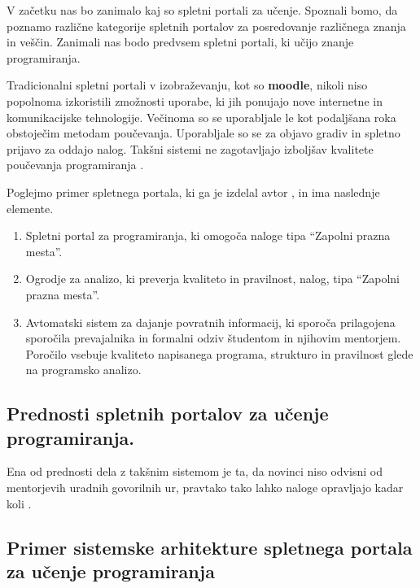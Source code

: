 V začetku nas bo zanimalo kaj so spletni portali za učenje. Spoznali
bomo, da poznamo različne kategorije spletnih portalov za posredovanje
različnega znanja in veščin. Zanimali nas bodo  predvsem spletni
portali, ki učijo znanje programiranja.

Tradicionalni spletni portali v izobraževanju, kot so \textbf{moodle},
nikoli niso popolnoma izkoristili zmožnosti uporabe, ki jih ponujajo
nove internetne in komunikacijske tehnologije. Večinoma so se
uporabljale le kot podaljšana roka obstoječim metodam
poučevanja. Uporabljale so se za objavo gradiv in spletno prijavo za
oddajo nalog. Takšni sistemi ne zagotavljajo izboljšav kvalitete
poučevanja programiranja \cite{ITaLCP_DistanceEdu}.

Poglejmo primer spletnega portala, ki ga je izdelal avtor
\cite{thesisAWebP}, in ima naslednje elemente.

\begin{enumerate}
\def\labelenumi{\arabic{enumi}.}
\item
  Spletni portal za programiranja, ki omogoča naloge tipa ``Zapolni
  prazna mesta''.
\item
  Ogrodje za analizo, ki preverja kvaliteto in pravilnost, nalog, tipa
  ``Zapolni prazna mesta''.
\item
  Avtomatski sistem za dajanje povratnih informacij, ki sporoča
  prilagojena sporočila prevajalnika in formalni odziv študentom in
  njihovim mentorjem. Poročilo vsebuje kvaliteto napisanega programa,
  strukturo in pravilnost glede na programsko analizo.
\end{enumerate}

\subsection{Prednosti spletnih portalov za učenje programiranja. }
\label{sec:prednosti_spzup}

Ena od prednosti dela z takšnim sistemom je ta, da novinci niso odvisni
od mentorjevih uradnih govorilnih ur, pravtako tako lahko naloge
opravljajo kadar koli \cite{thesisAWebP}.


\subsection{Primer sistemske arhitekture spletnega portala za učenje
  programiranja}
\label{sec:Primer_aritekture_spletnega_portala}

